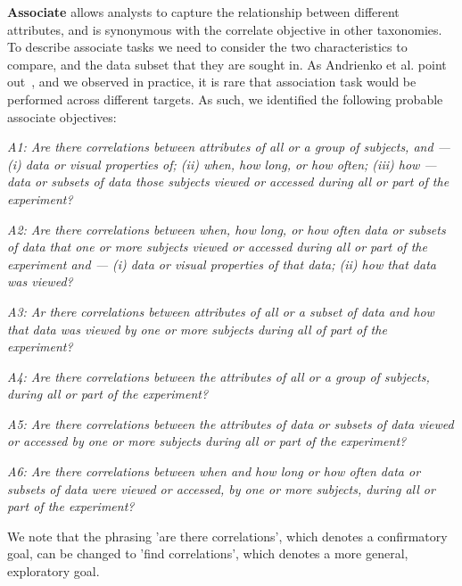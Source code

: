 \vspace{2mm}
\noindent\textbf{Associate} allows analysts to capture the relationship between different attributes, and is synonymous with the correlate objective in other taxonomies. To describe associate tasks we need to consider the two characteristics to compare, and the data subset that they are sought in. As Andrienko et al. point out~\cite{And03}, and we observed in practice, it is rare that association task would be performed across different targets. As such, we identified the following probable associate objectives:

\vspace{2mm}
\hangindent=3mm\textit{A1: Are there correlations between attributes of all or a group of subjects, and --- (i) data or visual properties of; (ii) when, how long, or how often; (iii) how --- data or subsets of data those subjects viewed or accessed during all or part of the experiment?} 

\vspace{2mm}
\hangindent=3mm\textit{A2: Are there correlations between when, how long, or how often data or subsets of data that one or more subjects viewed or accessed during all or part of the experiment and --- (i) data or visual properties of that data; (ii) how that data was viewed?}

\vspace{2mm}
\hangindent=3mm\textit{A3: Ar there correlations between attributes of all or a subset of data and how that data was viewed by one or more subjects during all of part of the experiment?}

\vspace{2mm}
\hangindent=3mm\textit{A4: Are there correlations between the attributes of all or a group of subjects, during all or part of the experiment?}

\vspace{2mm}
\hangindent=3mm\textit{A5: Are there correlations between the attributes of data or subsets of data viewed or accessed by one or more subjects during all or part of the experiment?}

\vspace{2mm}
\hangindent=3mm\textit{A6: Are there correlations between when and how long or how often data or subsets of data were viewed or accessed, by one or more subjects, during all or part of the experiment?}

\vspace{2mm}
We note that the phrasing 'are there correlations', which denotes a confirmatory goal, can be changed to 'find correlations', which denotes a more general, exploratory goal.

